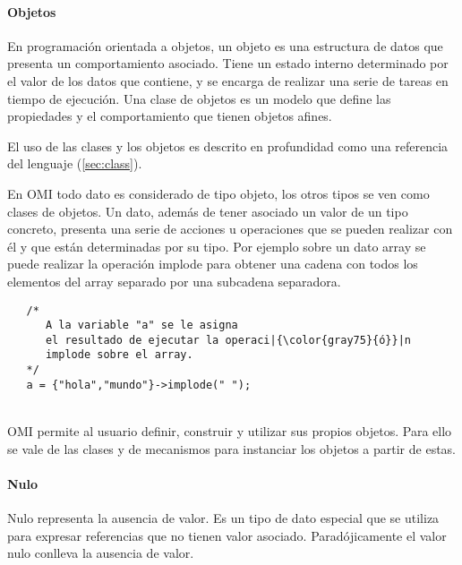 \paragraph{Objetos} \label{sec:type_object}
En programación orientada a objetos, un objeto es una estructura de datos que presenta un comportamiento asociado. Tiene un estado interno 
determinado por el valor de los datos que contiene, y se encarga de realizar una serie de tareas en tiempo de ejecución. Una clase de objetos es un
modelo que define las propiedades y el comportamiento que tienen objetos afines. 

El uso de las clases y los objetos es descrito en profundidad como una referencia del lenguaje (\autoref{sec:class}).


En OMI todo dato es considerado de tipo objeto, los otros tipos se ven como clases de objetos. Un dato, además de tener asociado un valor de un tipo concreto, 
presenta  una serie de acciones u operaciones que se pueden realizar con él y que están determinadas por su tipo. Por ejemplo sobre un dato array se puede realizar la operación
implode para obtener una cadena con todos los elementos del array separado por una subcadena separadora. \\

\begin{lstlisting}
   /*
      A la variable "a" se le asigna
      el resultado de ejecutar la operaci|{\color{gray75}{ó}}|n 
      implode sobre el array. 
   */
   a = {"hola","mundo"}->implode(" ");
\end{lstlisting} 
\hfill\\

OMI permite al usuario definir, construir y utilizar sus propios objetos. Para ello se vale de las clases
y de mecanismos para instanciar los objetos a partir de estas.


\paragraph{Nulo}
Nulo representa la ausencia de valor. Es un tipo de dato especial que se utiliza para expresar referencias que no tienen valor asociado. Paradójicamente el
valor nulo conlleva la ausencia de valor. 

